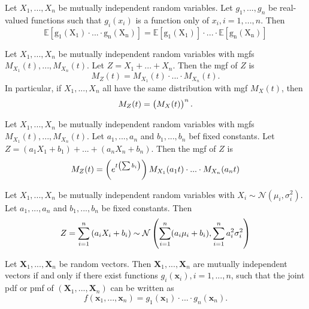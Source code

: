 \documentclass{article}
\theoremstyle{plain}
\newenvironment{theorem}[1]
      {\renewcommand\theinnertheorem{#1}\innertheorem}
      {\endinnertheorem}
\theoremstyle{definition}
\theoremstyle{plain}
\theoremstyle{plain}
\newenvironment{corollary}[1]
      {\renewcommand\theinnercorollary{#1}\innercorollary}
      {\endinnercorollary}
\renewcommand{\vec}[1]{\boldsymbol{#1}}
\newcommand{\E}[1]{\mathrm{\mathbb{E} \left[#1 \right]}}
\begin{document}
\begin{multicols}{2}
\begin{theorem}{4.6.6}[]
  Let $X_1, ..., X_n$ be mutually independent random variables.
  Let $g_1, ..., g_n$ be real-valued functions such that $g_i(x_i)$ is a function
  only of $x_i, i = 1, ..., n$.
  Then
  \begin{equation*}
    \E{g_1(X_1) \cdot ... \cdot g_n(X_n)}
    =
  \E{g_1(X_1)} \cdot ... \cdot \E{g_n(X_n)}
  \end{equation*}
\end{theorem}

\begin{theorem}{4.6.7}[]
  Let $X_1, ..., X_n$ be mutually independent random variables with mgfs
  $M_{X_1}(t), ..., M_{X_n}(t)$. Let $Z = X_1 + ... + X_n$.
  Then the mgf of $Z$ is
  \begin{equation*}
    M_Z(t) = M_{X_1}(t) \cdot ... \cdot M_{X_n}(t).
  \end{equation*}
  In particular, if $X_1, ..., X_n$ all have the same distribution with mgf
  $M_X(t)$, then
  \begin{equation*}
    M_Z(t) = \del{M_X(t)}^n.
  \end{equation*}
\end{theorem}

\begin{corollary}{4.6.9}[]
  Let $X_1, ..., X_n$ be mutually independent random variables with mgfs
  $M_{X_1}(t), ..., M_{X_n}(t)$. Let $a_1, ..., a_n$ and $b_1, ..., b_n$
  bef fixed constants. Let $Z = (a_1 X_1 + b_1) + ... + (a_n X_n + b_n)$.
  Then the mgf of $Z$ is
  \begin{equation*}
    M_Z(t) = \del{e^{t\del{\sum b_i}}} M_{X_1}(a_1 t) \cdot ... \cdot M_{X_n}(a_n t)
  \end{equation*}
\end{corollary}

\begin{corollary}{4.6.10}[]
  Let $X_1, ..., X_n$ be mutually independent random variables with
  $X_i \sim \mathcal{N}(\mu_i, \sigma_i^{2})$. Let $a_1, ..., a_n$
  and $b_1, ..., b_n$ be fixed constants. Then
  \begin{equation*}
    Z = \sum_{i = 1}^{n} \del{a_i X_i + b_i}
    \sim
    \mathcal{N}\del{
      \sum_{i = 1}^{n} (a_i \mu_i + b_i), \sum_{i = 1}^{n} a_i^{2} \sigma_i^{2}
    }
  \end{equation*}
\end{corollary}

\begin{theorem}{4.6.11}[]
  Let $\vec{X}_1, ..., \vec{X}_n$ be random vectors.
  Then $\vec{X}_1, ..., \vec{X}_n$ are mutually independent vectors if and only if
  there exist functions $g_i(\vec{x}_i), i = 1, ..., n$, such that the joint pdf or pmf of
  $(\vec{X}_1, ..., \vec{X}_n)$ can be written as
  \begin{equation*}
    f(\vec{x}_1, ..., \vec{x}_n) = g_1(\vec{x}_1) \cdot ... \cdot g_n(\vec{x}_n).
  \end{equation*}
\end{theorem}


\end{multicols}
\end{document}
